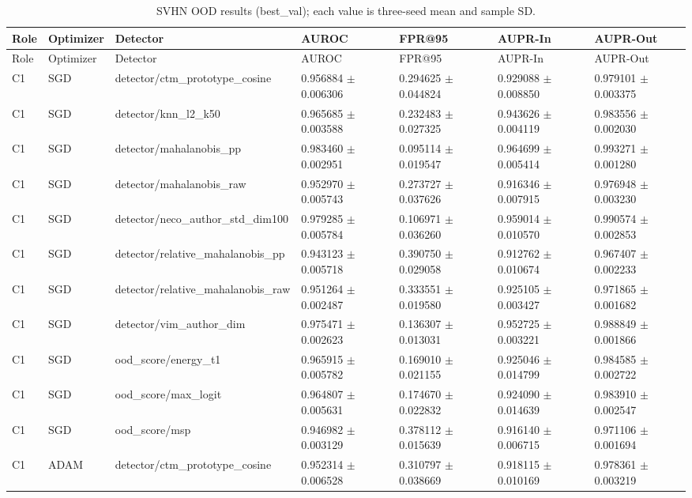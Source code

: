 \begin{longtable}{lllllll}
\caption{SVHN OOD results (best\_val); each value is three-seed mean and sample SD.}\\
Role & Optimizer & Detector & AUROC & FPR@95 & AUPR-In & AUPR-Out \\
\hline
\endfirsthead
Role & Optimizer & Detector & AUROC & FPR@95 & AUPR-In & AUPR-Out \\
\hline
\endhead
C1 & SGD & detector/ctm\_prototype\_cosine & 0.956884 $\pm$ 0.006306 & 0.294625 $\pm$ 0.044824 & 0.929088 $\pm$ 0.008850 & 0.979101 $\pm$ 0.003375 \\
C1 & SGD & detector/knn\_l2\_k50 & 0.965685 $\pm$ 0.003588 & 0.232483 $\pm$ 0.027325 & 0.943626 $\pm$ 0.004119 & 0.983556 $\pm$ 0.002030 \\
C1 & SGD & detector/mahalanobis\_pp & 0.983460 $\pm$ 0.002951 & 0.095114 $\pm$ 0.019547 & 0.964699 $\pm$ 0.005414 & 0.993271 $\pm$ 0.001280 \\
C1 & SGD & detector/mahalanobis\_raw & 0.952970 $\pm$ 0.005743 & 0.273727 $\pm$ 0.037626 & 0.916346 $\pm$ 0.007915 & 0.976948 $\pm$ 0.003230 \\
C1 & SGD & detector/neco\_author\_std\_dim100 & 0.979285 $\pm$ 0.005784 & 0.106971 $\pm$ 0.036260 & 0.959014 $\pm$ 0.010570 & 0.990574 $\pm$ 0.002853 \\
C1 & SGD & detector/relative\_mahalanobis\_pp & 0.943123 $\pm$ 0.005718 & 0.390750 $\pm$ 0.029058 & 0.912762 $\pm$ 0.010674 & 0.967407 $\pm$ 0.002233 \\
C1 & SGD & detector/relative\_mahalanobis\_raw & 0.951264 $\pm$ 0.002487 & 0.333551 $\pm$ 0.019580 & 0.925105 $\pm$ 0.003427 & 0.971865 $\pm$ 0.001682 \\
C1 & SGD & detector/vim\_author\_dim & 0.975471 $\pm$ 0.002623 & 0.136307 $\pm$ 0.013031 & 0.952725 $\pm$ 0.003221 & 0.988849 $\pm$ 0.001866 \\
C1 & SGD & ood\_score/energy\_t1 & 0.965915 $\pm$ 0.005782 & 0.169010 $\pm$ 0.021155 & 0.925046 $\pm$ 0.014799 & 0.984585 $\pm$ 0.002722 \\
C1 & SGD & ood\_score/max\_logit & 0.964807 $\pm$ 0.005631 & 0.174670 $\pm$ 0.022832 & 0.924090 $\pm$ 0.014639 & 0.983910 $\pm$ 0.002547 \\
C1 & SGD & ood\_score/msp & 0.946982 $\pm$ 0.003129 & 0.378112 $\pm$ 0.015639 & 0.916140 $\pm$ 0.006715 & 0.971106 $\pm$ 0.001694 \\
C1 & ADAM & detector/ctm\_prototype\_cosine & 0.952314 $\pm$ 0.006528 & 0.310797 $\pm$ 0.038669 & 0.918115 $\pm$ 0.010169 & 0.978361 $\pm$ 0.003219 \\

\end{longtable}
